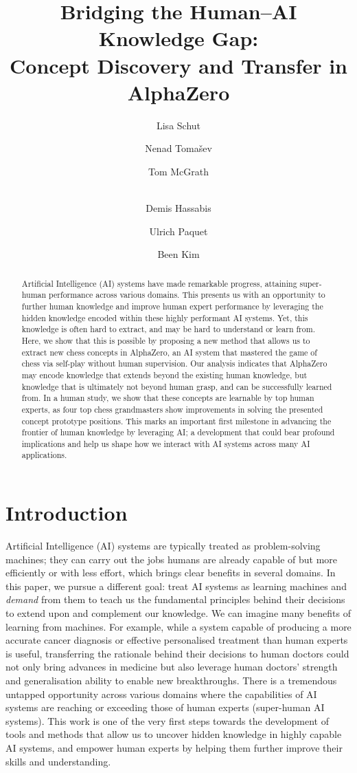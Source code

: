 \documentclass{article}
\title{Bridging the Human--AI Knowledge Gap: \\ Concept Discovery and Transfer in AlphaZero}
\author[1,*]{Lisa Schut}
\author[2]{Nenad Toma\v{s}ev}
\author[2]{Tom McGrath}
\author[2]{\\ Demis Hassabis}
\author[2]{Ulrich Paquet}
\author[2]{Been Kim}
\affil[1]{\footnotesize OATML, Dept. of Computer Science, University of Oxford}
\affil[2]{\footnotesize Google DeepMind}
\affil[*]{\footnotesize Work done at Google DeepMind}
\begin{document}
\maketitle

\begin{abstract}
Artificial Intelligence (AI) systems have made remarkable progress, attaining super-human performance across various domains. 
This presents us with an opportunity to further human knowledge and improve human expert performance by leveraging the hidden knowledge encoded within these highly performant AI systems. Yet, this knowledge is often hard to extract, and may be hard to understand or learn from. Here, we show that this is possible by proposing a new method that allows us to extract new chess concepts in AlphaZero, an AI system that mastered the game of chess via self-play without human supervision. Our analysis indicates that AlphaZero may encode knowledge that extends beyond the existing human knowledge, but knowledge that is ultimately not beyond human grasp, and can be successfully learned from. In a human study, we show that these concepts are learnable by top human experts, as four top chess grandmasters show improvements in solving the presented concept prototype positions. 
This marks an important first milestone in advancing the frontier of human knowledge by leveraging AI; a development that could bear profound implications and help us shape how we interact with AI systems across many AI applications. 
\end{abstract}


\section{Introduction}
Artificial Intelligence (AI) systems are typically treated as problem-solving machines; they can carry out the jobs humans are already capable of but more efficiently or with less effort, which brings clear benefits in several domains. 
In this paper, we pursue a different goal: treat AI systems as learning machines and \textit{demand} from them to teach us the fundamental principles behind their decisions to
extend upon and complement our knowledge. We can imagine many benefits of learning from machines. For example, while a system capable of producing a more accurate cancer diagnosis or effective personalised treatment than human experts is useful, 
transferring the rationale behind their decisions to human doctors could not only bring advances in medicine but also leverage human doctors' strength and generalisation ability to enable new breakthroughs.
There is a tremendous untapped opportunity across various domains where the capabilities of AI systems are reaching or exceeding those of human experts (super-human AI systems).
This work is one of the very first steps towards the development of tools and methods that allow us to uncover hidden knowledge in highly capable AI systems, and empower human experts by helping them further improve their skills and understanding. 
\end{document}
